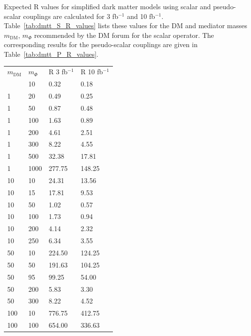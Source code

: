 \begin{table}[h!]
Expected R values for simplified dark matter models using scalar and pseudo-scalar couplings are calculated for 3 fb$^{-1 }$ and 10 fb$^{-1 }$. Table~\ref{tab:dmtt_S_R_values} lists these
values for the DM and mediator masses $m_\textrm{DM}$, $m_\Phi$ recommended by the DM forum for the scalar operator. The corresponding results for the pseudo-scalar couplings are given in Table~\ref{tab:dmtt_P_R_values}. 

\begin{table}
  \centering
  \begin{tabular}{llll}
    \hline                      
    $m_\textrm{DM}$ & $m_\Phi$  & R 3 fb$^{-1}$ & R 10 fb$^{-1}$ \\ \hlin
    1       & 10      & 0.32    & 0.18 \\ \hline
    1       & 20      & 0.49    & 0.25 \\ \hline
    1       & 50      & 0.87    & 0.48 \\ \hline
    1       & 100     & 1.63    & 0.89 \\ \hline
    1       & 200     & 4.61    & 2.51 \\ \hline
    1       & 300     & 8.22    & 4.55 \\ \hline
    1       & 500     & 32.38   & 17.81 \\ \hline
    1       & 1000    & 277.75  & 148.25 \\ \hline
    10      & 10      & 24.31   & 13.56 \\ \hline
    10      & 15      & 17.81   & 9.53 \\ \hline
    10      & 50      & 1.02    & 0.57 \\ \hline
    10      & 100     & 1.73    & 0.94 \\ \hline
    10      & 200     & 4.14    & 2.32 \\ \hline
    10      & 250     & 6.34    & 3.55 \\ \hline
    50      & 10      & 224.50  & 124.25 \\ \hline
    50      & 50      & 191.63  & 104.25 \\ \hline
    50      & 95      & 99.25   & 54.00 \\ \hline
    50      & 200     & 5.83    & 3.30 \\ \hline
    50      & 300     & 8.22    & 4.52 \\ \hline
    100     & 10      & 776.75  & 412.75 \\ \hline
    100     & 100     & 654.00  & 336.63 \\ \hline

\end{tabular}
\end{table}
\end{table}
